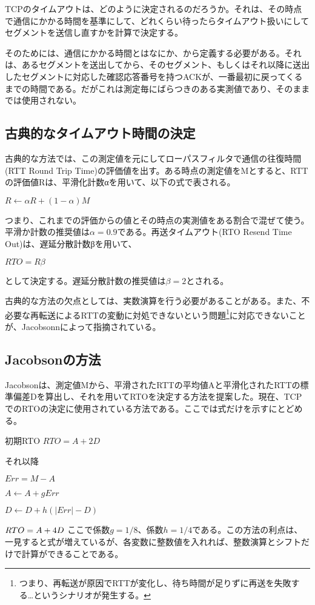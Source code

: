 TCPのタイムアウトは、どのように決定されるのだろうか。それは、その時点で通信にかかる時間を基準にして、どれくらい待ったらタイムアウト扱いにしてセグメントを送信し直すかを計算で決定する。

そのためには、通信にかかる時間とはなにか、から定義する必要がある。それは、あるセグメントを送出してから、そのセグメント、もしくはそれ以降に送出したセグメントに対応した確認応答番号を持つACKが、一番最初に戻ってくるまでの時間である。だがこれは測定毎にばらつきのある実測値であり、そのままでは使用されない。

\subsection{古典的なタイムアウト時間の決定}

古典的な方法では、この測定値を元にしてローパスフィルタで通信の往復時間(RTT Round Trip Time)の評価値を出す。ある時点の測定値をMとすると、RTTの評価値Rは、平滑化計数αを用いて、以下の式で表される。


$R ← αR + (1-α)M$


つまり、これまでの評価からの値とその時点の実測値をある割合で混ぜて使う。平滑か計数の推奨値は$α=0.9$である。再送タイムアウト(RTO Resend Time Out)は、遅延分散計数βを用いて、

$RTO = Rβ$

として決定する。遅延分散計数の推奨値は$β=2$とされる。

古典的な方法の欠点としては、実数演算を行う必要があることがある。また、不必要な再転送によるRTTの変動に対処できないという問題\footnote{つまり、再転送が原因でRTTが変化し、待ち時間が足りずに再送を失敗する…というシナリオが発生する。}に対応できないことが、Jacobsonnによって指摘されている。

\subsection{Jacobsonの方法}

Jacobsonは、測定値Mから、平滑されたRTTの平均値Aと平滑化されたRTTの標準偏差Dを算出し、それを用いてRTOを決定する方法を提案した。現在、TCPでのRTOの決定に使用されている方法である。ここでは式だけを示すにとどめる。


初期RTO $RTO = A + 2D$


それ以降 


$Err = M - A $

$A ← A + gErr$

$D ← D + h(|Err| - D) $

$RTO = A + 4D \\$
ここで係数$g=1/8$、係数$h=1/4$である。この方法の利点は、一見すると式が増えているが、各変数に整数値を入れれば、整数演算とシフトだけで計算ができることである。

